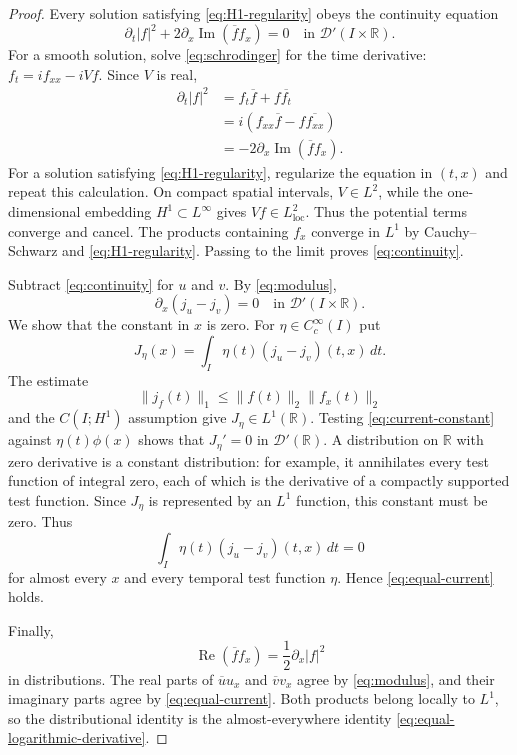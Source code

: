 \documentclass[11pt]{amsart}
\numberwithin{equation}{section}
\theoremstyle{remark}
\newcommand{\R}{\mathbb R}
\newcommand{\D}{\mathcal D}
\begin{document}
\begin{proof}
Every solution satisfying \eqref{eq:H1-regularity} obeys the continuity
equation
\begin{equation}
 \partial_t|f|^2+2\partial_x
 \operatorname{Im}(\overline f f_x)=0
 \quad\text{in }\D'(I\times\R).
 \label{eq:continuity}
\end{equation}
For a smooth solution, solve \eqref{eq:schrodinger} for the time derivative:
$f_t=if_{xx}-iVf$.  Since $V$ is real,
\begin{align*}
 \partial_t|f|^2
 &=f_t\overline f+f\overline{f_t}\\
 &=i(f_{xx}\overline f-f\overline{f_{xx}})\\
 &=-2\partial_x\operatorname{Im}(\overline f f_x).
\end{align*}
For a solution satisfying \eqref{eq:H1-regularity}, regularize the equation in
$(t,x)$ and repeat this calculation.  On compact spatial intervals,
$V\in L^2$, while the one-dimensional embedding
$H^1\subset L^\infty$ gives $Vf\in L^2_{\mathrm{loc}}$.  Thus the potential
terms converge and cancel.  The products containing $f_x$ converge in
$L^1$ by Cauchy--Schwarz and \eqref{eq:H1-regularity}.  Passing to the limit
proves \eqref{eq:continuity}.

Subtract \eqref{eq:continuity} for $u$ and $v$.  By
\eqref{eq:modulus},
\begin{equation}
 \partial_x(j_u-j_v)=0
 \quad\text{in }\D'(I\times\R).
 \label{eq:current-constant}
\end{equation}
We show that the constant in $x$ is zero.  For $\eta\in C_c^\infty(I)$ put
\[
 J_\eta(x)=\int_I\eta(t)(j_u-j_v)(t,x)\,dt.
\]
The estimate
\[
 \|j_f(t)\|_1\le\|f(t)\|_2\|f_x(t)\|_2
\]
and the $C(I;H^1)$ assumption give $J_\eta\in L^1(\R)$.  Testing
\eqref{eq:current-constant} against $\eta(t)\phi(x)$ shows that
$J_\eta'=0$ in $\D'(\R)$.  A distribution on $\R$ with zero derivative is a
constant distribution: for example, it annihilates every test function of
integral zero, each of which is the derivative of a compactly supported test
function.  Since $J_\eta$ is represented by an $L^1$ function, this constant
must be zero.  Thus
\[
 \int_I\eta(t)(j_u-j_v)(t,x)\,dt=0
\]
for almost every $x$ and every temporal test function $\eta$.  Hence
\eqref{eq:equal-current} holds.

Finally,
\[
 \operatorname{Re}(\overline f f_x)
 =\frac12\partial_x|f|^2
\]
in distributions.  The real parts of $\overline u u_x$ and
$\overline v v_x$ agree by \eqref{eq:modulus}, and their imaginary parts agree
by \eqref{eq:equal-current}.  Both products belong locally to $L^1$, so the
distributional identity is the almost-everywhere identity
\eqref{eq:equal-logarithmic-derivative}.
\end{proof}
\end{document}
